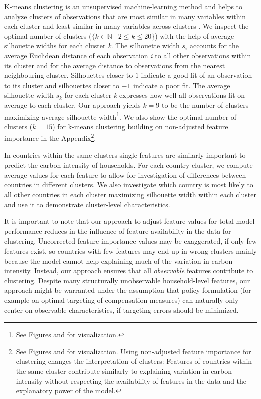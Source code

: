 \documentclass[12pt, a4paper]{article}
\begin{document}
K-means clustering is an unsupervised machine-learning method and helps to analyze clusters of observations that are most similar in many variables within each cluster and least similar in many variables across clusters \autocite{MacQueen.1967}. We inspect the optimal number of clusters ($\{k \in \mathbb{N} \mid 2  \leq k \leq 20 \}$) with the help of average silhouette widths \autocite{Rousseeuw.1987} for each cluster \textit{k}. The silhouette width $s_{i}$ accounts for the average Euclidean distance of each observation \textit{i} to all other observations within its cluster and for the average distance to observations from the nearest neighbouring cluster. Silhouettes closer to $1$ indicate a good fit of an observation to its cluster and silhouettes closer to $-1$ indicate a poor fit. The average silhouette width $\overline{s_{k}}$ for each cluster \textit{k} expresses how well all observations fit on average to each cluster. Our approach yields $k = 9$ to be the number of clusters maximizing average silhouette width\footnote{See Figures and  for visualization.}. We also show the optimal number of clusters ($k = 15$) for k-means clustering building on non-adjusted feature importance in the Appendix\footnote{See Figures  and  for visualization. Using non-adjusted feature importance for clustering changes the interpretation of clusters: Features of countries within the same cluster contribute similarly to explaining variation in carbon intensity without respecting the availability of features in the data and the explanatory power of the model.}.

In countries within the same clusters single features are similarly important to predict the carbon intensity of households. For each country-cluster, we compute average values for each feature to allow for investigation of differences between countries in different clusters. We also investigate which country is most likely to all other countries in each cluster maximizing silhouette width within each cluster and use it to demonstrate cluster-level characteristics. 

It is important to note that our approach to adjust feature values for total model performance reduces in the influence of feature availability in the data for clustering. Uncorrected feature importance values may be exaggerated, if only few features exist, so countries with few features may end up in wrong clusters mainly because the model cannot help explaining much of the variation in carbon intensity. Instead, our approach ensures that all \textit{observable} features contribute to clustering. Despite many structurally unobservable household-level features, our approach might be warranted under the assumption that policy formulation (for example on optimal targeting of compensation measures) can naturally only center on observable characteristics, if targeting errors should be minimized.
\end{document}

